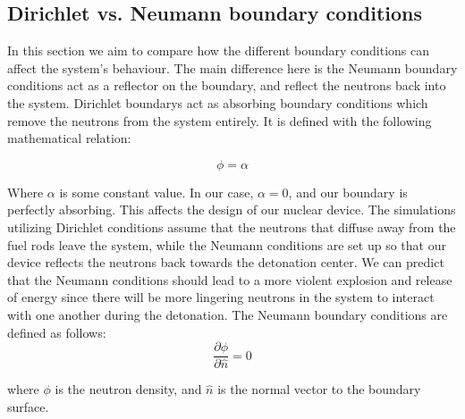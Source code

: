 \documentclass[letterpaper, 12pt]{article}
\begin{document}
      \subsection{Dirichlet vs. Neumann boundary conditions}
         In this section we aim to compare how the different boundary conditions can affect the system's behaviour. The main difference here is the Neumann boundary conditions act as a reflector on the boundary, and reflect the neutrons back into the system. Dirichlet boundarys act as absorbing boundary conditions which remove the neutrons from the system entirely. It is defined with the following mathematical relation:

         \begin{equation}
            \phi = \alpha
         \end{equation}
      
         Where $\alpha$ is some constant value. In our case, $\alpha = 0$, and our boundary is perfectly absorbing.
         This affects the design of our nuclear device. The simulations utilizing Dirichlet conditions assume that the neutrons that diffuse away from the fuel rods leave the system, while the Neumann conditions are set up so that our device reflects the neutrons back towards the detonation center. We can predict that the Neumann conditions should lead to a more violent explosion and release of energy since there will be more lingering neutrons in the system to interact with one another during the detonation. The Neumann boundary conditions are defined as follows:
         \begin{equation}
            \frac{\partial \phi}{\partial \hat{n}} = 0 
         \end{equation}

         where $\phi$ is the neutron density, and $\hat{n}$ is the normal vector to the boundary surface.\\
\end{document}
